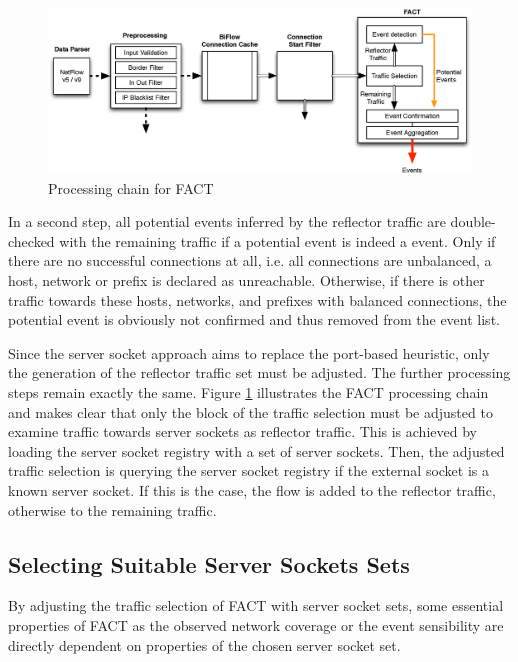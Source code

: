 \begin{figure}
	[!b] \centering
	\includegraphics[width=\linewidth]{images/FACT.eps}
	\caption{Processing chain for FACT} 
	\label{fig:fact_chain} 
\end{figure}

In a second step, all potential events inferred by the reflector traffic are  double-checked with the remaining traffic if a potential event is indeed a  event. 
Only if there are no successful connections at all, i.e. all connections  are unbalanced, a host, network or prefix is declared as unreachable. 
Otherwise, if there is other traffic towards these hosts, networks, and prefixes with balanced connections, the potential event is obviously not confirmed and thus removed from the event list. 

Since the \gls{server socket} approach aims to replace the port-based heuristic,  only the generation of the reflector traffic set must be adjusted. 
The further processing steps remain exactly the same. 
Figure \ref{fig:fact_chain} illustrates the \gls{FACT} processing chain and makes clear that only the block of the traffic selection must be adjusted to examine traffic towards \glspl{server socket} as reflector traffic. 
This is achieved by loading the \gls{server socket} registry with a set of \glspl{server socket}. 
Then, the adjusted traffic selection is querying the server socket registry if the external socket is a known \gls{server socket}. 
If this is the case, the flow is added to the reflector traffic, otherwise to the remaining traffic. 

\subsection{Selecting Suitable Server Sockets Sets\label{section:ses_selection}}
By adjusting the traffic selection of \gls{FACT} with \gls{server socket} sets,  some essential properties of \gls{FACT} as the observed network coverage or the event sensibility are directly dependent on properties of the chosen \gls{server socket} set. 

